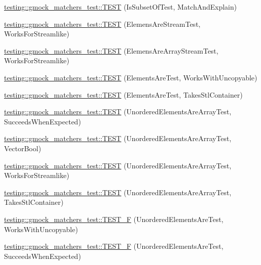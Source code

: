 \begin{DoxyCompactItemize}
\item 
\mbox{\hyperlink{namespacetesting_1_1gmock__matchers__test_a45d11b31944031c232a0de0f47f0538a}{testing\+::gmock\+\_\+matchers\+\_\+test\+::\+T\+E\+ST}} (Is\+Subset\+Of\+Test, Match\+And\+Explain)
\item 
\mbox{\hyperlink{namespacetesting_1_1gmock__matchers__test_adb0f512a2369d69f056e42e1cc5f3fc2}{testing\+::gmock\+\_\+matchers\+\_\+test\+::\+T\+E\+ST}} (Elemens\+Are\+Stream\+Test, Works\+For\+Streamlike)
\item 
\mbox{\hyperlink{namespacetesting_1_1gmock__matchers__test_a5cc317a80c3501cb7f53d07043b7270c}{testing\+::gmock\+\_\+matchers\+\_\+test\+::\+T\+E\+ST}} (Elemens\+Are\+Array\+Stream\+Test, Works\+For\+Streamlike)
\item 
\mbox{\hyperlink{namespacetesting_1_1gmock__matchers__test_ab403dce87c2d198a4f709d7f781d03c6}{testing\+::gmock\+\_\+matchers\+\_\+test\+::\+T\+E\+ST}} (Elements\+Are\+Test, Works\+With\+Uncopyable)
\item 
\mbox{\hyperlink{namespacetesting_1_1gmock__matchers__test_a290280b9e89a57833c9fc706d153b98a}{testing\+::gmock\+\_\+matchers\+\_\+test\+::\+T\+E\+ST}} (Elements\+Are\+Test, Takes\+Stl\+Container)
\item 
\mbox{\hyperlink{namespacetesting_1_1gmock__matchers__test_adb7e47654f1536fc049243f765292825}{testing\+::gmock\+\_\+matchers\+\_\+test\+::\+T\+E\+ST}} (Unordered\+Elements\+Are\+Array\+Test, Succeeds\+When\+Expected)
\item 
\mbox{\hyperlink{namespacetesting_1_1gmock__matchers__test_a3d7df4fa0dd3e8247f4c2d4b02d801f0}{testing\+::gmock\+\_\+matchers\+\_\+test\+::\+T\+E\+ST}} (Unordered\+Elements\+Are\+Array\+Test, Vector\+Bool)
\item 
\mbox{\hyperlink{namespacetesting_1_1gmock__matchers__test_a1ff2a93a8f031a5b23dbc699a462043b}{testing\+::gmock\+\_\+matchers\+\_\+test\+::\+T\+E\+ST}} (Unordered\+Elements\+Are\+Array\+Test, Works\+For\+Streamlike)
\item 
\mbox{\hyperlink{namespacetesting_1_1gmock__matchers__test_aa3a960ec78e2b1e860c305f4598f39ec}{testing\+::gmock\+\_\+matchers\+\_\+test\+::\+T\+E\+ST}} (Unordered\+Elements\+Are\+Array\+Test, Takes\+Stl\+Container)
\item 
\mbox{\hyperlink{namespacetesting_1_1gmock__matchers__test_ab09132c3b991b8f104f3091370d2fe55}{testing\+::gmock\+\_\+matchers\+\_\+test\+::\+T\+E\+S\+T\+\_\+F}} (Unordered\+Elements\+Are\+Test, Works\+With\+Uncopyable)
\item 
\mbox{\hyperlink{namespacetesting_1_1gmock__matchers__test_a177c3db59da001df2441deb1ddb083af}{testing\+::gmock\+\_\+matchers\+\_\+test\+::\+T\+E\+S\+T\+\_\+F}} (Unordered\+Elements\+Are\+Test, Succeeds\+When\+Expected)

\end{DoxyCompactItemize}
